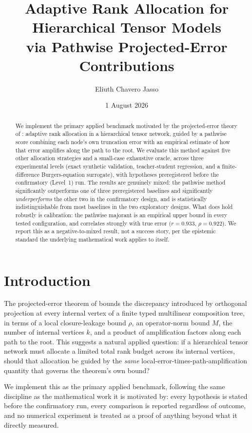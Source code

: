 \documentclass[11pt]{amsart}
\title[Adaptive rank allocation via pathwise projected-error contributions]{Adaptive Rank Allocation for Hierarchical Tensor Models\\ via Pathwise Projected-Error Contributions}
\author{Eliuth Chavero Jasso}
\date{1 August 2026}
\theoremstyle{remark}
\theoremstyle{definition}
\begin{document}
\maketitle

\begin{abstract}
We implement the primary applied benchmark motivated by the projected-error theory of
\cite{ChaveroJassoTrees}: adaptive rank allocation in a hierarchical tensor network, guided
by a pathwise score combining each node's own truncation error with an empirical estimate
of how that error amplifies along the path to the root. We evaluate this method against
five other allocation strategies and a small-case exhaustive oracle, across three
experimental levels (exact synthetic validation, teacher-student regression, and a
finite-difference Burgers-equation surrogate), with hypotheses preregistered before the
confirmatory (Level~1) run. The results are genuinely mixed: the pathwise method
significantly outperforms one of three preregistered baselines and significantly
\emph{underperforms} the other two in the confirmatory design, and is statistically
indistinguishable from most baselines in the two exploratory designs. What does hold
robustly is calibration: the pathwise majorant is an empirical upper bound in every tested
configuration, and correlates strongly with true error ($r=0.933$, $\rho=0.922$). We report
this as a negative-to-mixed result, not a success story, per the epistemic standard the
underlying mathematical work applies to itself.
\end{abstract}

\section{Introduction}

The projected-error theorem of \cite{ChaveroJassoTrees} bounds the discrepancy introduced
by orthogonal projection at every internal vertex of a finite typed multilinear composition
tree, in terms of a local closure-leakage bound $\rho$, an operator-norm bound $M$, the
number of internal vertices $k$, and a product of amplification factors along each path to
the root. This suggests a natural applied question: if a hierarchical tensor network must
allocate a limited total rank budget across its internal vertices, should that allocation be
guided by the \emph{same} local-error-times-path-amplification quantity that governs the
theorem's own bound?

We implement this as the primary applied benchmark, following the same discipline as the
mathematical work it is motivated by: every hypothesis is stated before the confirmatory
run, every comparison is reported regardless of outcome, and no numerical experiment is
treated as a proof of anything beyond what it directly measured.
\end{document}
